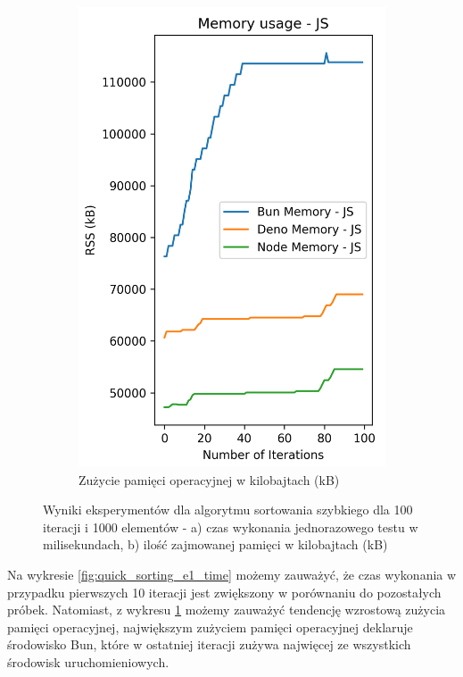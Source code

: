 \begin{figure}[H]
\begin{subfigure}[b]{0.44\textwidth}
    \includegraphics[width=\textwidth]{Figures/sorting/sorting_quick_100_1000_js_memory.png}
    \caption{Zużycie pamięci operacyjnej w kilobajtach (kB)}
    \label{fig:quick_sorting_e1_memory}
  \end{subfigure}
  \caption{Wyniki eksperymentów dla algorytmu sortowania szybkiego dla 100 iteracji i 1000 elementów - a) czas wykonania jednorazowego testu w milisekundach, b) ilość zajmowanej pamięci w kilobajtach (kB)}
  \label{fig:quick_sorting_e1}
\end{figure}

Na wykresie \ref{fig:quick_sorting_e1_time} możemy zauważyć, że czas wykonania w przypadku pierwszych 10 iteracji jest zwiększony w porównaniu do pozostałych próbek. Natomiast, z wykresu \ref{fig:quick_sorting_e1_memory} możemy zauważyć tendencję wzrostową zużycia pamięci operacyjnej, największym zużyciem pamięci operacyjnej deklaruje środowisko Bun, które w ostatniej iteracji zużywa najwięcej ze wszystkich środowisk uruchomieniowych.

